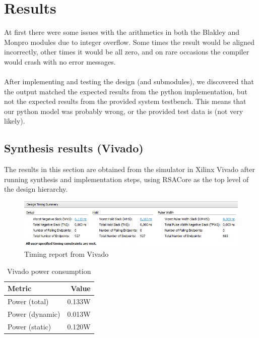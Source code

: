 \chapter{Results}
At first there were some issues with the arithmetics in both the Blakley and Monpro modules due to integer overflow. Some times the result would be aligned incorrectly, other times it would be all zero, and on rare occasions the compiler would crash with no error messages.\\
\\
After implementing and testing the design (and submodules), we discovered that the output matched the expected results from the python implementation, but not the expected results from the provided system testbench. This means that our python model was probably wrong, or the provided test data is (not very likely).

\section{Synthesis results (Vivado)}
The results in this section are obtained from the simulator in Xilinx Vivado after running synthesis and implementation steps, using RSACore as the top level of the design hierarchy.

\begin{figure}[H]
\centering
\includegraphics[width=\textwidth]{images/Vivado_timing}
\caption{Timing report from Vivado}
\label{fig:timing}
\end{figure}
\begin{table}[H]
    \centering
    \begin{tabular}{l|r}
        Metric & Value \\ \hline
        Power (total) & 0.133W\\
        Power (dynamic) & 0.013W \\
        Power (static) & 0.120W \\
    \end{tabular}
    \caption{Vivado power consumption}
    \label{tab:vivado_synth_results}
\end{table}

